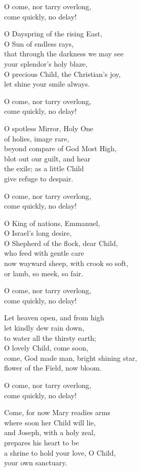 \begin{lyrics}
O come, nor tarry overlong,\\
come quickly, no delay!

O Dayspring of the rising East,\\
O Sun of endless rays,\\
that through the darkness we may see\\
your splendor’s holy blaze,\\
O precious Child, the Christian’s joy,\\
let shine your smile always.

O come, nor tarry overlong,\\
come quickly, no delay!

O spotless Mirror, Holy One\\
of holies, image rare,\\
beyond compare of God Most High,\\
blot out our guilt, and hear\\
the exile; as a little Child\\
give refuge to despair.

O come, nor tarry overlong,\\
come quickly, no delay!

O King of nations, Emmanuel,\\
O Israel’s long desire,\\
O Shepherd of the flock, dear Child,\\
who feed with gentle care\\
now wayward sheep, with crook so soft,\\
or lamb, so meek, so fair.

O come, nor tarry overlong,\\
come quickly, no delay!

Let heaven open, and from high\\
let kindly dew rain down,\\
to water all the thirsty earth;\\
O lovely Child, come soon,\\
come, God made man, bright shining star,\\
flower of the Field, now bloom.

O come, nor tarry overlong,\\
come quickly, no delay!

Come, for now Mary readies arms\\
where soon her Child will lie,\\
and Joseph, with a holy zeal,\\
prepares his heart to be\\
a shrine to hold your love, O Child,\\
your own sanctuary.


\end{lyrics}
